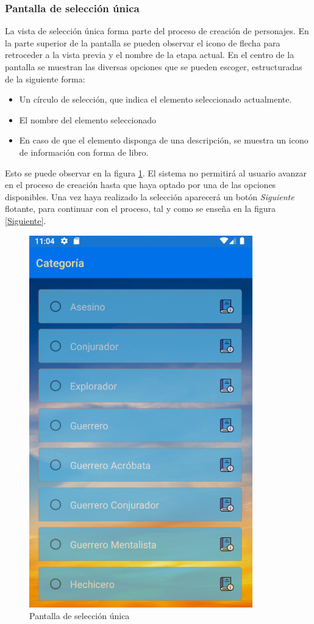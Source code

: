 \subsubsection{Pantalla de selección única}
La vista de selección única forma parte del proceso de creación de personajes. En la parte superior de la 
pantalla se pueden observar el icono de flecha para retroceder a la vista previa y el nombre de la etapa actual.
En el centro de la pantalla se muestran las diversas opciones que se pueden escoger, estructuradas de la siguiente forma:
\begin{itemize}
    \item Un círculo de selección, que indica el elemento seleccionado actualmente.
    \item El nombre del elemento seleccionado
    \item En caso de que el elemento disponga de una descripción, se muestra un icono de información con forma de libro.
\end{itemize}
Esto se puede observar en la figura \ref*{SeleccionUnica}. El sistema no permitirá al usuario avanzar en el proceso de creación 
hasta que haya optado por una de las opciones disponibles. Una vez haya realizado la selección aparecerá un botón \textit{Siguiente}
flotante, para continuar con el proceso, tal y como se enseña en la figura \ref*{Siguiente}.

\begin{figure}[H]
    \centering
    \includegraphics[scale=0.7]{Figures/Capturas/SeleccionUnica.png}
    \caption{Pantalla de selección única}
    \label{SeleccionUnica}    
\end{figure}

